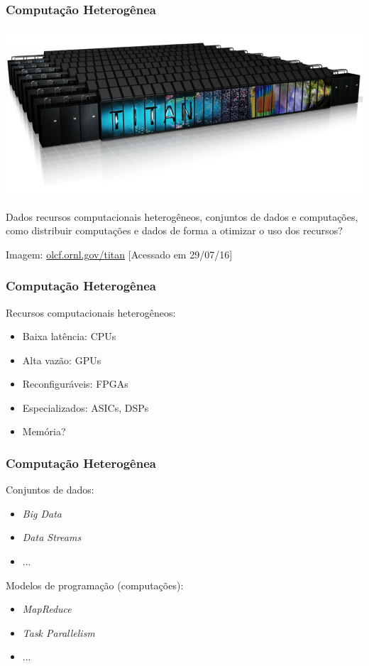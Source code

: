 \documentclass[10pt, compress]{beamer}
\begin{document}
\begin{frame}
    \frametitle{Computação Heterogênea}
    \begin{center}
        \includegraphics[width=.83\textwidth]{titan}
    \end{center}

    \pause

    Dados recursos computacionais \alert{heterogêneos}, conjuntos de
    \alert{dados} e \alert{computações}, como distribuir computações e dados de
    forma a \alert{otimizar o uso} dos recursos?
    \hfill

    \begin{center}
    \tiny{Imagem: \url{olcf.ornl.gov/titan} [Acessado em 29/07/16]}
    \end{center}
\end{frame}

\begin{frame}
    \frametitle{Computação Heterogênea}
    Recursos computacionais \alert{heterogêneos}:
    \pause
    \begin{itemize}
        \item Baixa latência: CPUs
            \pause
        \item Alta vazão: GPUs
            \pause
        \item Reconfiguráveis: FPGAs
            \pause
        \item Especializados: ASICs, DSPs
            \pause
        \item Memória?
    \end{itemize}
\end{frame}

\begin{frame}
    \frametitle{Computação Heterogênea}
    Conjuntos de \alert{dados}:
    \begin{itemize}
        \item \textit{Big Data}
        \item \textit{Data Streams}
        \item ...
    \end{itemize}
    \pause
    Modelos de programação (\alert{computações}):
    \begin{itemize}
        \item \textit{MapReduce}
        \item \textit{Task Parallelism}
        \item ...
    \end{itemize}
\end{frame}
\end{document}
